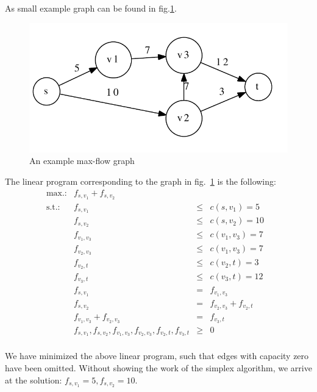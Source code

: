 \documentclass{article}
\begin{document}
As small example graph can be found in fig.\ref{fig:exg}.

\begin{figure}
  \centering
  \includegraphics[width=.7\textwidth]{exg.pdf}
  \caption{An example max-flow graph}
  \label{fig:exg}
\end{figure}

The linear program corresponding to the graph in fig.~\ref{fig:exg} is
the following:
\[
\begin{array}{lrcll}
\textrm{max.:} & f_{s,v_1} + f_{s,v_2} & & &\\
\textrm{s.t.:} & f_{s,v_1} &\leq & c(s,v_1) = 5&\\
               & f_{s,v_2} &\leq & c(s,v_2) = 10&\\
               & f_{v_1,v_3} &\leq & c(v_1,v_3) = 7&\\
               & f_{v_2,v_3} &\leq & c(v_1,v_3) = 7&\\
               & f_{v_2,t} &\leq & c(v_2,t) = 3&\\
               & f_{v_3,t} &\leq & c(v_3,t) = 12&\\
               & f_{s,v_1} &= &f_{v_1,v_3}&\\
               & f_{s,v_2} &= &f_{v_2,v_3} + f_{v_2,t}&\\
               & f_{v_1,v_3} + f_{v_2,v_3} &= &f_{v_3,t}&\\
& f_{s,v_1}, f_{s,v_2},f_{v_1,v_3},f_{v_2,v_3},f_{v_2,t}, f_{v_3,t} & \geq & 0\\
\end{array}
\]

We have minimized the above linear program, such that edges with
capacity zero have been omitted. Without showing the work of the
simplex algorithm, we arrive at the solution: $f_{s,v_1} = 5, f_{s,v_2} =
10$.

\section*{\hfill}
\end{document}
